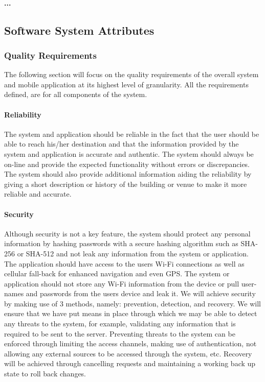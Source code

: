 \documentclass[runningheads,a4paper]{article}
\begin{document}
\paragraph{...}

 
\subsection{Software System Attributes}
\subsubsection{Quality Requirements }
The following section will focus on the quality requirements of the overall system and mobile application at its highest level of granularity. All the requirements defined, are for all components of the system.

\paragraph{\textbf{Reliability}\\}
The system and application should be reliable in the fact that the user should be able to reach his/her destination and that the information provided by the system and application is accurate and authentic. The system should always be on-line and provide the expected functionality without errors or discrepancies. The system should also provide additional information aiding the reliability by giving a short description or history of the building or venue to make it more reliable and accurate. 

\paragraph{\textbf{Security}\\}
Although security is not a key feature, the system should protect any personal information by hashing passwords with a secure hashing algorithm such as SHA-256 or SHA-512 and not leak any information from the system or application. The application should have access to the users Wi-Fi connections as well as cellular fall-back for enhanced navigation and even GPS. The system or application should not store any Wi-Fi information from the device or pull user-names and passwords from the users device and leak it.
We will achieve security by making use of 3 methods, namely: prevention, detection, and recovery. We will ensure that we have put means in
place through which we may be able to detect any threats to the system,
for example, validating any information that is required to be sent to the
server. Preventing threats to the system can be enforced through limiting the access channels, making use of authentication, not allowing any
external sources to be accessed through the system, etc. Recovery will be
achieved through cancelling requests and maintaining a working back up
state to roll back changes.  
\end{document}
